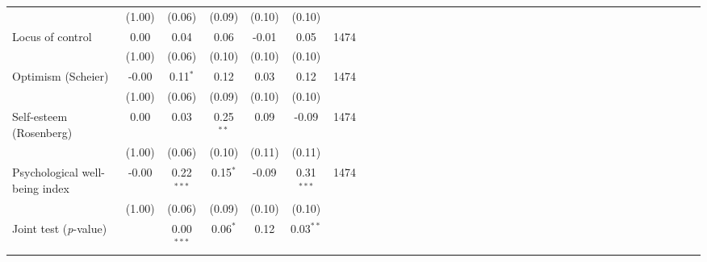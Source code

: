 {\begin{tabular}{l*{6}{SSSSSc}}
          &   (1.00)&   (0.06)&   (0.09)&   (0.10)&   (0.10)&         \\
Locus of control&     0.00&     0.04&     0.06&    -0.01&     0.05&     1474\\
          &   (1.00)&   (0.06)&   (0.10)&   (0.10)&   (0.10)&         \\
Optimism (Scheier)&    -0.00&0.11$^{*}$&     0.12&     0.03&     0.12&     1474\\
          &   (1.00)&   (0.06)&   (0.09)&   (0.10)&   (0.10)&         \\
Self-esteem (Rosenberg)&     0.00&     0.03&0.25$^{**}$&     0.09&    -0.09&     1474\\
          &   (1.00)&   (0.06)&   (0.10)&   (0.11)&   (0.11)&         \\
Psychological well-being index&    -0.00&0.22$^{***}$&0.15$^{*}$&    -0.09&0.31$^{***}$&     1474\\
          &   (1.00)&   (0.06)&   (0.09)&   (0.10)&   (0.10)&         \\
\midrule Joint test (\emph{p}-value)&         &0.00$^{***}$&0.06$^{*}$&     0.12&0.03$^{**}$&         \\
\bottomrule
\end{tabular}
}
